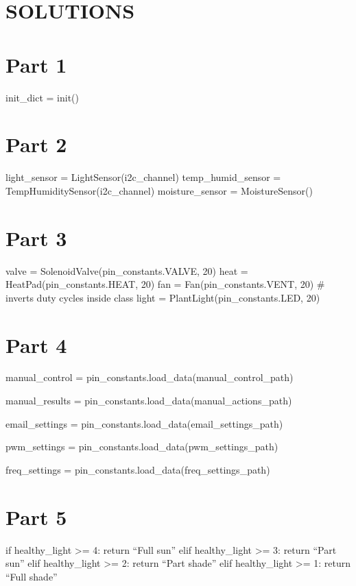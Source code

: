 \documentclass[
]{article}
\author{}
\date{}
\begin{document}
\hypertarget{solutions}{%
\section{SOLUTIONS}\label{solutions}}

\hypertarget{part-1}{%
\section{Part 1}\label{part-1}}

init\_dict = init()

\hypertarget{part-2}{%
\section{Part 2}\label{part-2}}

light\_sensor = LightSensor(i2c\_channel) temp\_humid\_sensor =
TempHumiditySensor(i2c\_channel) moisture\_sensor = MoistureSensor()

\hypertarget{part-3}{%
\section{Part 3}\label{part-3}}

valve = SolenoidValve(pin\_constants.VALVE, 20) heat =
HeatPad(pin\_constants.HEAT, 20) fan = Fan(pin\_constants.VENT, 20) \#
inverts duty cycles inside class light = PlantLight(pin\_constants.LED,
20)

\hypertarget{part-4}{%
\section{Part 4}\label{part-4}}

manual\_control = pin\_constants.load\_data(manual\_control\_path)

manual\_results = pin\_constants.load\_data(manual\_actions\_path)

email\_settings = pin\_constants.load\_data(email\_settings\_path)

pwm\_settings = pin\_constants.load\_data(pwm\_settings\_path)

freq\_settings = pin\_constants.load\_data(freq\_settings\_path)

\hypertarget{part-5}{%
\section{Part 5}\label{part-5}}

if healthy\_light \textgreater= 4: return ``Full sun'' elif
healthy\_light \textgreater= 3: return ``Part sun'' elif healthy\_light
\textgreater= 2: return ``Part shade'' elif healthy\_light \textgreater=
1: return ``Full shade''
\end{document}
